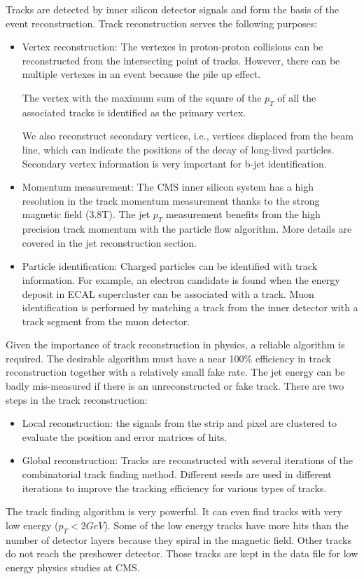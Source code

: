 Tracks are detected by inner silicon detector signals and form the basis of the event reconstruction. Track reconstruction serves the following purposes: 
\begin{itemize}
\item Vertex reconstruction: The vertexes in proton-proton collisions can be reconstructed from the intersecting point of tracks. However, there can be multiple vertexes in an event because the pile up effect. 

The vertex with the maximum sum of the square of the $p_{T}$ of all the associated tracks is identified as the primary vertex. 

We also reconstruct secondary vertices, i.e., vertices displaced from the beam line, which can indicate the positions of the decay of long-lived particles. Secondary vertex information is very important for b-jet identification.
\item Momentum measurement: The CMS inner silicon system has a high resolution in the track momentum measurement thanks to the strong magnetic field (3.8T). The jet $p_{T}$ measurement benefits from the high precision track momentum with the particle flow algorithm. More details are covered in the jet reconstruction section.
\item Particle identification: Charged particles can be identified with track information. For example, an electron candidate is found when the energy deposit in ECAL supercluster can be associated with a track. Muon identification is performed by matching a track from the inner detector with a track segment from the muon detector.
\end{itemize}

Given the importance of track reconstruction in physics, a reliable algorithm is required. The desirable algorithm must have a near 100\% efficiency in track reconstruction together with a relatively small fake rate. The jet energy can be badly mis-measured if there is an unreconstructed or fake track.
There are two steps in the track reconstruction: 
\begin{itemize}
\item Local reconstruction: the signals from the strip and pixel are clustered to evaluate the position and error matrices of hits.
\item Global reconstruction: Tracks are reconstructed with several iterations of the combinatorial track finding method\cite{Adam:2005cg}. Different seeds are used in different iterations to improve the tracking efficiency for various types of tracks.
\end{itemize}
The track finding algorithm is very powerful. It can even find tracks with very low energy ($p_{T}<2 GeV$). Some of the low energy tracks have more hits than the number of detector layers because they spiral in the magnetic field. Other tracks do not reach the preshower detector. Those tracks are kept in the data file for low energy physics studies at CMS. 

